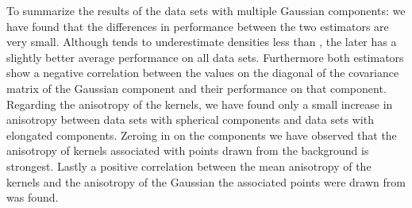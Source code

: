	To summarize the results of the data sets with multiple Gaussian components: we have found that the differences in performance between the two estimators are very small. Although \sambe tends to underestimate densities less than \mbe, the later has a slightly better average performance on all data sets.
	Furthermore both estimators show a negative correlation between the values on the diagonal of the covariance matrix of the Gaussian component and their performance on that component.
	Regarding the anisotropy of the kernels, we have found only a small increase in anisotropy between data sets with spherical components and data sets with elongated components.
	Zeroing in on the components we have observed that the anisotropy of kernels associated with points drawn from the background is strongest.
	Lastly a positive correlation between the mean anisotropy of the kernels and the anisotropy of the Gaussian the associated points were drawn from was found.